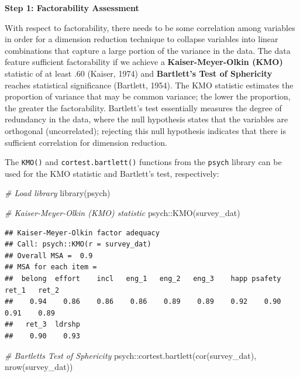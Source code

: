 \documentclass[
]{book}
\newenvironment{Shaded}{\begin{snugshade}}{\end{snugshade}}
\newcommand{\CommentTok}[1]{\textcolor[rgb]{0.56,0.35,0.01}{\textit{#1}}}
\newcommand{\FunctionTok}[1]{\textcolor[rgb]{0.00,0.00,0.00}{#1}}
\newcommand{\NormalTok}[1]{#1}
\newcommand{\SpecialCharTok}[1]{\textcolor[rgb]{0.00,0.00,0.00}{#1}}
\begin{document}
\textbf{Step 1: Factorability Assessment}

With respect to factorability, there needs to be some correlation among variables in order for a dimension reduction technique to collapse variables into linear combinations that capture a large portion of the variance in the data. The data feature sufficient factorability if we achieve a \textbf{Kaiser-Meyer-Olkin (KMO)} statistic of at least \(.60\) (Kaiser, 1974) and \textbf{Bartlett's Test of Sphericity} reaches statistical significance (Bartlett, 1954). The KMO statistic estimates the proportion of variance that may be common variance; the lower the proportion, the greater the factorability. Bartlett's test essentially measures the degree of redundancy in the data, where the null hypothesis states that the variables are orthogonal (uncorrelated); rejecting this null hypothesis indicates that there is sufficient correlation for dimension reduction.

The \texttt{KMO()} and \texttt{cortest.bartlett()} functions from the \texttt{psych} library can be used for the KMO statistic and Bartlett's test, respectively:

\begin{Shaded}
\begin{Highlighting}[]
\CommentTok{\# Load library}
\FunctionTok{library}\NormalTok{(psych)}

\CommentTok{\# Kaiser{-}Meyer{-}Olkin (KMO) statistic}
\NormalTok{psych}\SpecialCharTok{::}\FunctionTok{KMO}\NormalTok{(survey\_dat)}
\end{Highlighting}
\end{Shaded}

\begin{verbatim}
## Kaiser-Meyer-Olkin factor adequacy
## Call: psych::KMO(r = survey_dat)
## Overall MSA =  0.9
## MSA for each item = 
##  belong  effort    incl   eng_1   eng_2   eng_3    happ psafety   ret_1   ret_2 
##    0.94    0.86    0.86    0.86    0.89    0.89    0.92    0.90    0.91    0.89 
##   ret_3  ldrshp 
##    0.90    0.93
\end{verbatim}

\begin{Shaded}
\begin{Highlighting}[]
\CommentTok{\# Bartlett\textquotesingle{}s Test of Sphericity}
\NormalTok{psych}\SpecialCharTok{::}\FunctionTok{cortest.bartlett}\NormalTok{(}\FunctionTok{cor}\NormalTok{(survey\_dat), }\FunctionTok{nrow}\NormalTok{(survey\_dat))}
\end{Highlighting}
\end{Shaded}
\end{document}
